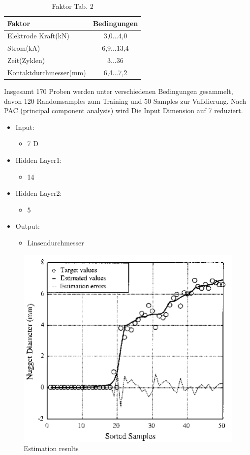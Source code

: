 \documentclass[english,ngerman]{tudscrreprt}
\begin{document}
\begin{table}[H]
\caption{Faktor Tab. 2}
\begin{flushleft}
	\begin{tabular}{lc} 
		\toprule
 		\textbf{Faktor} & \textbf{Bedingungen} \\
		\midrule
		Elektrode Kraft(kN)& 3,0...4,0\\
		
		Strom(kA)& 6,9...13,4\\
		
		Zeit(Zyklen) & 3...36\\
		
		Kontaktdurchmesser(mm) & 6,4...7,2\\
		\bottomrule
	\end{tabular}
\end{flushleft}
\end{table}
Insgesamt 170 Proben werden unter verschiedenen Bedingungen gesammelt, davon 120 Randomsamples zum Training und 50 Samples zur Validierung.
Nach PAC (principal component analysis) wird Die Input Dimension auf 7 reduziert.
\begin{itemize}
\item Input:
\begin{itemize}
	\item 7 D
\end{itemize}
\item Hidden Layer1:
\begin{itemize}
	\item 14
\end{itemize}
\item Hidden Layer2:
\begin{itemize}
	\item 5
\end{itemize}
\item Output:
\begin{itemize}
	\item Linsendurchmesser
\end{itemize}
\end{itemize}
\begin{figure}[H]
\centering
\includegraphics{./Bilder/Estimation results.png}
\caption{Estimation results}\label{fgg:Result}
\end{figure}
\end{document}
